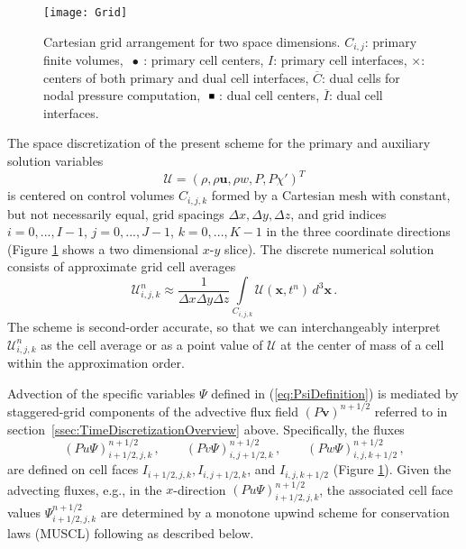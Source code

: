 \documentclass[12pt,a4paper]{article}
\theoremstyle{definition}
\newcommand{\eq}[1]{(\ref{#1})}
\newcommand{\vect}[1]{{\mathbf{#1}}}
\newcommand{\vu}{\vect{u}}
\newcommand{\vv}{\vect{v}}
\newcommand{\vx}{\vect{x}}
\newcommand{\half}{1/2}
\newcommand{\dz}{\Delta z}
\newcommand{\chiprime}{{\chi'}}
\newcommand{\Sol}{\mathcal{U}}
\newcommand{\dx}{{\Delta x}}
\newcommand{\dy}{{\Delta y}}
\begin{document}
\begin{figure}
\centering
 \texttt{[image: Grid]}
\caption{Cartesian grid arrangement for two space dimensions. 
$C_{i,j}$: primary finite volumes, 
$\ \bullet\ $: primary cell centers, $I$: primary cell interfaces,
$\times$: centers of both primary and dual cell interfaces, 
$\overline{C}$: dual cells for nodal pressure computation, $\ \rule[1pt]{4pt}{4pt}\ $:
dual cell centers, $\overline{I}$: dual cell interfaces.
\label{fig:GridArrangement}}
\end{figure}

The space discretization of the present scheme for the primary
and auxiliary solution variables 
%
\begin{equation}
\Sol = \left(\rho, \rho\vu, \rho w, P, P\chiprime \right)^T
\end{equation}
%
is centered on control volumes $C_{i,j,k}$ formed by a Cartesian mesh with constant,
but not necessarily equal, grid spacings $\dx, \dy, \dz$, and grid indices 
$i = 0, ..., I-1$, $j = 0, ..., J-1$, $k = 0, ..., K-1$ in the three coordinate directions (Figure \ref{fig:GridArrangement} shows a two dimensional $x$-$y$ slice). 
The discrete numerical solution consists of approximate grid cell averages 
%
\begin{equation}
\Sol_{i,j,k}^n \approx 
\frac{1}{\dx \dy \dz}\int\limits_{C_{i,j,k}} \Sol(\vx,t^n)\, d^3\vx\,.
\end{equation}
%
The scheme is second-order accurate, so that we can interchangeably interpret 
$\Sol_{i,j,k}^n$ as the cell average or as a point value of $\Sol$ at the center of 
mass of a cell within the approximation order.  

Advection of the specific variables $\Psi$ defined in \eq{eq:PsiDefinition} is mediated 
by staggered-grid components of the advective flux field $(P\vv)^{n+\half}$ referred
to in section~\ref{ssec:TimeDiscretizationOverview} 
above. Specifically, the fluxes
%
\begin{equation}\label{eq:DiscreteAdvectiveFluxes}
(Pu \Psi)^{n+\half}_{i+\half,j,k}\,,
\qquad
(Pv \Psi)^{n+\half}_{i,j+\half,k}\,, 
\qquad
(Pw \Psi)^{n+\half}_{i,j,k+\half}\,,
\end{equation}
%
are defined on cell faces $I_{i+\half,j,k}, I_{i,j+\half,k}$, and $I_{i,j,k+\half}$ 
(Figure \ref{fig:GridArrangement}). 
Given the advecting fluxes, e.g., in the $x$-direction 
$(Pu \Psi)^{n+\half}_{i+\half,j,k}$, the associated cell face values 
$\Psi^{n+\half}_{i+\half,j,k}$ 
are determined by a monotone upwind scheme for conservation laws (MUSCL) following 
\cite{vanLeer2006} as described below.
\end{document}

